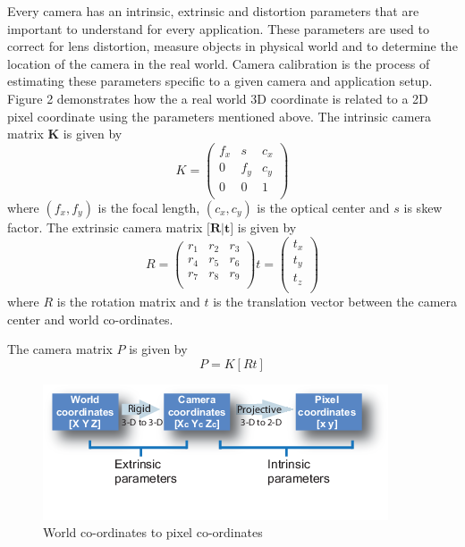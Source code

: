 Every camera has an intrinsic, extrinsic and distortion parameters that are important to understand for every application. These parameters are used to correct for lens distortion, measure objects in physical world and to determine the location of the camera in the real world. Camera calibration is the process of estimating these parameters specific to a given camera and application setup. Figure 2 demonstrates how the a real world 3D coordinate is related to a 2D pixel coordinate using the parameters mentioned above. The intrinsic camera matrix \textbf{K} is given by
\begin{equation}
K = 
\begin{pmatrix}
  f_x & s & c_x \\
  0 & f_y & c_y \\
  0 & 0 & 1 \\
 \end{pmatrix}
\end{equation}
where $(f_x, f_y)$ is the focal length, $(c_x, c_y)$ is the optical center
and $s$ is skew factor. The extrinsic camera matrix $\textbf{[R|t]}$ is given by
\begin{equation}
R = 
\begin{pmatrix}
  r_1 & r_2 & r_3 \\
  r_4 & r_5 & r_6 \\
  r_7 & r_8 & r_9 \\
 \end{pmatrix}
t = 
\begin{pmatrix}
  t_x \\
  t_y \\
  t_z \\
 \end{pmatrix}
\end{equation}
where $R$ is the rotation matrix and $t$ is the translation vector between the camera center and world co-ordinates. 

The camera matrix $P$ is given by 
\begin{equation}
P = K[R t]
\end{equation}

\begin{figure}[H]
  \includegraphics[width=\textwidth]{./figures/imageParams.png}
\caption{World co-ordinates to pixel co-ordinates~\cite{camMATLAB}}
\label{fig:2}       %
\end{figure}

